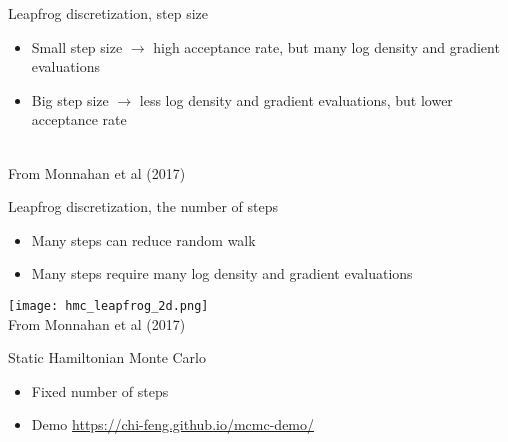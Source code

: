 \documentclass[finnish,english,t]{beamer}
\begin{document}
\begin{frame}{Leapfrog discretization, step size}

  \vspace{-0.5\baselineskip}
  \begin{itemize}
    \item Small step size $\rightarrow$ high acceptance rate, but many
      log density and gradient evaluations
    \item Big step size $\rightarrow$ less log density and gradient
      evaluations, but lower acceptance rate 
    \end{itemize}
  \\
  {\footnotesize From Monnahan et al (2017)}
\end{frame}

\begin{frame}{Leapfrog discretization, the number of steps}

    \begin{itemize}
    \item Many steps can reduce random walk
    \item Many steps require many log density and gradient evaluations
    \end{itemize}
  {\texttt{[image: hmc\_leapfrog\_2d.png]}}\\
  {\footnotesize From Monnahan et al (2017)}
\end{frame}
  
\begin{frame}{Static Hamiltonian Monte Carlo}

  \begin{itemize}
  \item Fixed number of steps
  \item Demo \url{https://chi-feng.github.io/mcmc-demo/}
  \end{itemize}

\end{frame}
\end{document}
